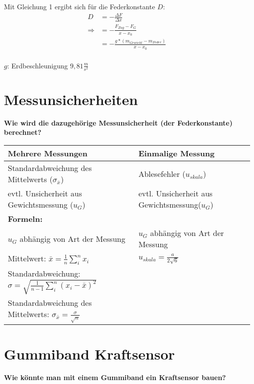 \documentclass[a4paper, 12pt]{article}
\begin{document}

Mit Gleichung 1 ergibt sich für die Federkonstante $D$:
\begin{equation}
\begin{split}
D &= -\frac{\Delta F}{\Delta x}\\
\Rightarrow &= -\frac{F_{Zug}-F_G}{x-x_0}\\
 &=-\frac{g*(m_{Gewicht} - m_{Feder})}{x-x_0}\\
\end{split}
\end{equation}

$g$: Erdbeschleunigung $9,81\frac{m}{s^2}$
\newpage
\section{Messunsicherheiten}
\textbf{Wie wird die dazugehörige Messunsicherheit (der Federkonstante) berechnet?}
\begin{table}[h]
\centering
\begin{tabular}{|l|l|}
\hline
\textbf{Mehrere Messungen} & \textbf{Einmalige Messung}\\
\hline
Standardabweichung des Mittelwerts ($\sigma_{\bar{x}}$) & Ablesefehler ($u_{skala}$)\\
evtl. Unsicherheit aus Gewichtsmessung ($u_G$)& evtl. Unsicherheit aus Gewichtsmessung($u_G$)\\
\hline
\multicolumn{1}{|l}{\textbf{Formeln:}}& \\
\hline
$u_G$ abhängig von Art der Messung & $u_G$ abhängig von Art der Messung\\
\hline
Mittelwert: $\bar{x} = \frac {1}{n}\sum_{i}^n x_i$ &  $u_{skala} = \frac {a}{2\sqrt{6}}$\\
\hline
Standardabweichung: $\sigma = \sqrt{\frac{1}{n-1}\sum_{i}^n (x_i - \bar{x})^2}$ &  \\
\hline
Standardabweichung des Mittelwerts: $\sigma_{\bar{x}}= \frac{\sigma}{\sqrt{n}}$ & \\
\hline
\end{tabular}
\end{table}

\section{Gummiband Kraftsensor}
\textbf{Wie könnte man mit einem Gummiband ein Kraftsensor bauen?}
\end{document}
